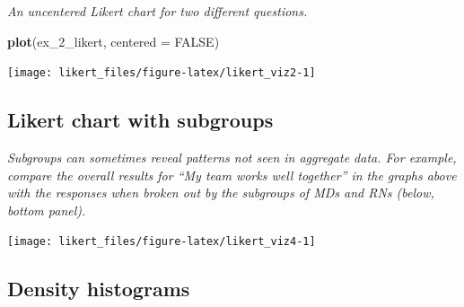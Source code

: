 \documentclass[]{book}
\newenvironment{Shaded}{\begin{snugshade}}{\end{snugshade}}
\newcommand{\KeywordTok}[1]{\textcolor[rgb]{0.13,0.29,0.53}{\textbf{{#1}}}}
\newcommand{\DataTypeTok}[1]{\textcolor[rgb]{0.13,0.29,0.53}{{#1}}}
\newcommand{\DecValTok}[1]{\textcolor[rgb]{0.00,0.00,0.81}{{#1}}}
\newcommand{\StringTok}[1]{\textcolor[rgb]{0.31,0.60,0.02}{{#1}}}
\newcommand{\CommentTok}[1]{\textcolor[rgb]{0.56,0.35,0.01}{\textit{{#1}}}}
\newcommand{\OtherTok}[1]{\textcolor[rgb]{0.56,0.35,0.01}{{#1}}}
\newcommand{\NormalTok}[1]{{#1}}
\begin{document}
\emph{An uncentered Likert chart for two different questions.}

\begin{Shaded}
\begin{Highlighting}[]
\KeywordTok{plot}\NormalTok{(ex_2_likert, }\DataTypeTok{centered =} \OtherTok{FALSE}\NormalTok{)}
\end{Highlighting}
\end{Shaded}

\begin{center}\texttt{[image: likert\_files/figure-latex/likert\_viz2-1]} \end{center}

\subsection{Likert chart with
subgroups}\label{likert-chart-with-subgroups}

\emph{Subgroups can sometimes reveal patterns not seen in aggregate
data. For example, compare the overall results for ``My team works well
together'' in the graphs above with the responses when broken out by the
subgroups of MDs and RNs (below, bottom panel).}

\begin{Shaded}
\end{Shaded}

\begin{center}\texttt{[image: likert\_files/figure-latex/likert\_viz4-1]} \end{center}

\subsection{Density histograms}\label{density-histograms}
\end{document}
